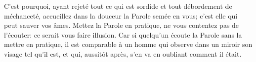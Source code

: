 C’est pourquoi, ayant rejeté tout ce qui est sordide
	et tout débordement de méchanceté,
	accueillez dans la douceur la Parole semée en vous;
	c’est elle qui peut sauver vos âmes.
Mettez la Parole en pratique, ne vous contentez pas de l’écouter:
	ce serait vous faire illusion.
Car si quelqu’un écoute la Parole sans la mettre en pratique,
	il est comparable à un homme
		qui observe dans un miroir son visage tel qu’il est,
	et qui, aussitôt après, s’en va en oubliant comment il était.
